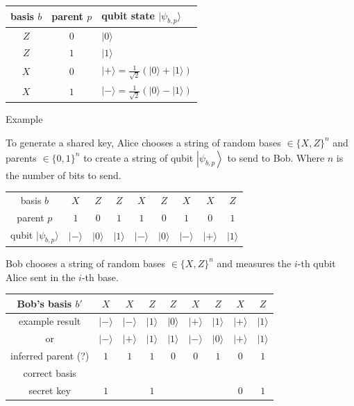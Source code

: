 \documentclass[
]{article}
\providecommand{\ket}[1]{\left\lvert #1 \right\rangle}
\begin{document}
\begin{tabular}{|c|c|l|}
	\hline
	basis $b$ & parent $p$ & qubit state $|\psi_{b,p}\rangle$                         \\
	\hline
	$Z$       & $0$        & $|0\rangle$                                              \\
	$Z$       & $1$        & $|1\rangle$                                              \\
	$X$       & $0$        & $|+\rangle = \tfrac{1}{\sqrt{2}}(|0\rangle + |1\rangle)$ \\
	$X$       & $1$        & $|-\rangle = \tfrac{1}{\sqrt{2}}(|0\rangle - |1\rangle)$ \\
	\hline
\end{tabular}

Example

To generate a shared key, Alice chooses a string of random bases $\in\{X,Z\}^n$ and parents $\in\{0,1\}^n$ to create a string of qubit $\ket{\psi_{b,p}}$ to send to Bob. Where $n$ is the number of bits to send.

\begin{tabular}{|c|cccccccc|}
	\hline
	basis $b$                  & $X$         & $Z$         & $Z$         & $X$         & $Z$         & $X$         & $X$         & $Z$         \\
	parent $p$                 & $1$         & $0$         & $1$         & $1$         & $0$         & $1$         & $0$         & $1$         \\
	qubit $|\psi_{b,p}\rangle$ & $|-\rangle$ & $|0\rangle$ & $|1\rangle$ & $|-\rangle$ & $|0\rangle$ & $|-\rangle$ & $|+\rangle$ & $|1\rangle$ \\
	\hline
\end{tabular}

Bob chooses a string of random bases $\in\{X,Z\}^n$ and measures the $i$-th qubit Alice sent in the $i$-th base.

\begin{tabular}{|c|cccccccc|}
	\hline
	Bob's basis $b'$    & $X$         & $X$         & $Z$         & $Z$         & $X$         & $Z$         & $X$         & $Z$         \\
	\hline
	example result      & $|-\rangle$ & $|-\rangle$ & $|1\rangle$ & $|0\rangle$ & $|+\rangle$ & $|1\rangle$ & $|+\rangle$ & $|1\rangle$ \\
	\quad or            & $|-\rangle$ & $|+\rangle$ & $|1\rangle$ & $|1\rangle$ & $|-\rangle$ & $|0\rangle$ & $|+\rangle$ & $|1\rangle$ \\
	\hline
	inferred parent (?) & $1$         & $1$         & $1$         & $0$         & $0$         & $1$         & $0$         & $1$         \\
	correct basis       & \checkmark  &             & \checkmark  &             &             &             & \checkmark  & \checkmark  \\
	secret key          & $1$         &             & $1$         &             &             &             & $0$         & $1$         \\
	\hline
\end{tabular}
\end{document}
